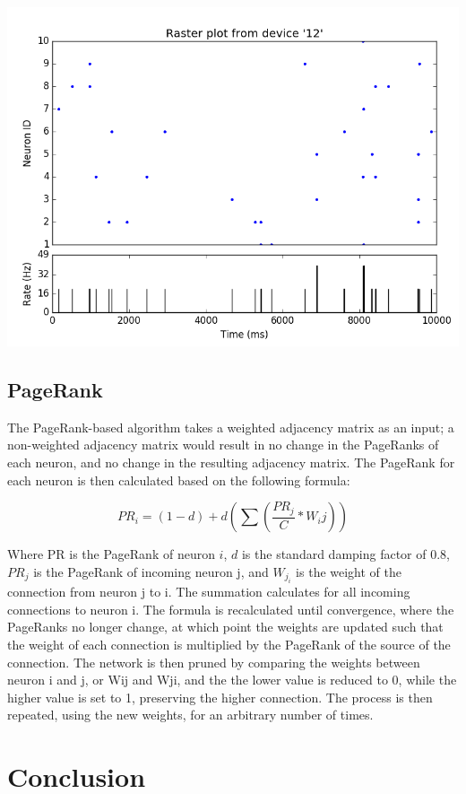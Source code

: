 \documentclass{article}
\begin{document}
\includegraphics[scale=0.5]{figures/figure1.png} 

\subsection{PageRank}
The PageRank-based algorithm takes a weighted adjacency matrix as an input; a non-weighted adjacency matrix would result in no change in the PageRanks of each neuron, and no change in the resulting adjacency matrix. The PageRank for each neuron is then calculated based on the following formula:

$$PR_i = (1-d)+d(\sum(\frac{PR_j}{C} * W_ij))$$

Where PR is the PageRank of neuron $i$, $d$ is the standard damping factor of 0.8, $PR_j$ is the PageRank of incoming neuron j, and $W_j_i$ is the weight of the connection from neuron j to i. The summation calculates for all incoming connections to neuron i. The formula is recalculated until convergence, where the PageRanks no longer change, at which point the weights are updated such that the weight of each connection is multiplied by the PageRank of the source of the connection. The network is then pruned by comparing the weights between neuron i and j, or Wij and Wji, and the the lower value is reduced to 0, while the higher value is set to 1, preserving the higher connection. The process is then repeated, using the new weights, for an arbitrary number of times.\par

\section{Conclusion}
\end{document}
